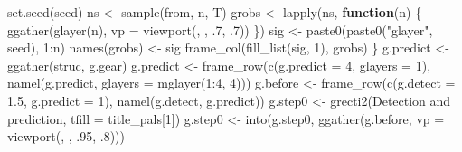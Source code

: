 \documentclass[
]{article}
\newenvironment{Shaded}{\begin{snugshade}}{\end{snugshade}}
\newcommand{\AttributeTok}[1]{\textcolor[rgb]{0.77,0.63,0.00}{#1}}
\newcommand{\ControlFlowTok}[1]{\textcolor[rgb]{0.13,0.29,0.53}{\textbf{#1}}}
\newcommand{\DecValTok}[1]{\textcolor[rgb]{0.00,0.00,0.81}{#1}}
\newcommand{\FloatTok}[1]{\textcolor[rgb]{0.00,0.00,0.81}{#1}}
\newcommand{\FunctionTok}[1]{\textcolor[rgb]{0.00,0.00,0.00}{#1}}
\newcommand{\NormalTok}[1]{#1}
\newcommand{\OtherTok}[1]{\textcolor[rgb]{0.56,0.35,0.01}{#1}}
\newcommand{\SpecialCharTok}[1]{\textcolor[rgb]{0.00,0.00,0.00}{#1}}
\newcommand{\StringTok}[1]{\textcolor[rgb]{0.31,0.60,0.02}{#1}}
\begin{document}
\begin{Shaded}
\begin{Highlighting}[]
  \FunctionTok{set.seed}\NormalTok{(seed)}
\NormalTok{  ns }\OtherTok{\textless{}{-}} \FunctionTok{sample}\NormalTok{(from, n, T)}
\NormalTok{  grobs }\OtherTok{\textless{}{-}} \FunctionTok{lapply}\NormalTok{(ns,}
    \ControlFlowTok{function}\NormalTok{(n) \{}
      \FunctionTok{ggather}\NormalTok{(}\FunctionTok{glayer}\NormalTok{(n), }\AttributeTok{vp =} \FunctionTok{viewport}\NormalTok{(, , .}\DecValTok{7}\NormalTok{, .}\DecValTok{7}\NormalTok{))}
\NormalTok{    \})}
\NormalTok{  sig }\OtherTok{\textless{}{-}} \FunctionTok{paste0}\NormalTok{(}\FunctionTok{paste0}\NormalTok{(}\StringTok{"glayer"}\NormalTok{, seed), }\DecValTok{1}\SpecialCharTok{:}\NormalTok{n)}
  \FunctionTok{names}\NormalTok{(grobs) }\OtherTok{\textless{}{-}}\NormalTok{ sig}
  \FunctionTok{frame\_col}\NormalTok{(}\FunctionTok{fill\_list}\NormalTok{(sig, }\DecValTok{1}\NormalTok{), grobs)}
\NormalTok{\}}
\NormalTok{g.predict }\OtherTok{\textless{}{-}} \FunctionTok{ggather}\NormalTok{(struc, g.gear)}
\NormalTok{g.predict }\OtherTok{\textless{}{-}} \FunctionTok{frame\_row}\NormalTok{(}\FunctionTok{c}\NormalTok{(}\AttributeTok{g.predict =} \DecValTok{4}\NormalTok{, }\AttributeTok{glayers =} \DecValTok{1}\NormalTok{),}
  \FunctionTok{namel}\NormalTok{(g.predict, }\AttributeTok{glayers =} \FunctionTok{mglayer}\NormalTok{(}\DecValTok{1}\SpecialCharTok{:}\DecValTok{4}\NormalTok{, }\DecValTok{4}\NormalTok{)))}
\NormalTok{g.before }\OtherTok{\textless{}{-}} \FunctionTok{frame\_row}\NormalTok{(}\FunctionTok{c}\NormalTok{(}\AttributeTok{g.detect =} \FloatTok{1.5}\NormalTok{, }\AttributeTok{g.predict =} \DecValTok{1}\NormalTok{),}
  \FunctionTok{namel}\NormalTok{(g.detect, g.predict))}
\NormalTok{g.step0 }\OtherTok{\textless{}{-}} \FunctionTok{grecti2}\NormalTok{(}\StringTok{\textquotesingle{}Detection and prediction\textquotesingle{}}\NormalTok{, }\AttributeTok{tfill =}\NormalTok{ title\_pals[}\DecValTok{1}\NormalTok{])}
\NormalTok{g.step0 }\OtherTok{\textless{}{-}} \FunctionTok{into}\NormalTok{(g.step0, }\FunctionTok{ggather}\NormalTok{(g.before, }\AttributeTok{vp =} \FunctionTok{viewport}\NormalTok{(, , .}\DecValTok{95}\NormalTok{, .}\DecValTok{8}\NormalTok{)))}


\end{Highlighting}
\end{Shaded}
\end{document}
